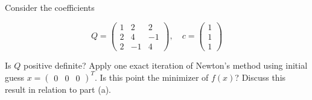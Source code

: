 Consider the coefficients

$$
Q = \begin{pmatrix}
    1 &  2 &  2 \\
    2 &  4 & -1 \\
    2 & -1 & 4
\end{pmatrix}, \quad c = \begin{pmatrix}
    1 \\
    1 \\
    1
\end{pmatrix}
$$

Is $Q$ positive definite? Apply one exact iteration of Newton's method using initial guess 
$x = \begin{pmatrix} 0 & 0 & 0 \end{pmatrix}^T$. Is this point the minimizer of $f(x)$? Discuss this result in relation 
to part (a).


